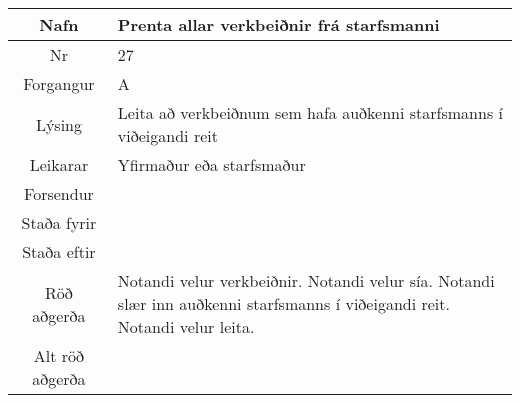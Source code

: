 \documentclass[a4paper]{article}
\begin{document}
\begin{tabular}{|c|p{10cm}|}
\hline
Nafn&Prenta allar verkbeiðnir frá starfsmanni\\
\hline
Nr&27\\
\hline
Forgangur&A\\
\hline
Lýsing&Leita að verkbeiðnum sem hafa auðkenni starfsmanns í viðeigandi reit\\
\hline
Leikarar&Yfirmaður eða starfsmaður\\
\hline
Forsendur&\\
\hline
Staða fyrir&\\
\hline
Staða eftir&\\
\hline
Röð aðgerða&Notandi velur verkbeiðnir. Notandi velur sía. Notandi slær inn auðkenni starfsmanns í viðeigandi reit. Notandi velur leita.\\
\hline
Alt röð aðgerða&\\
\hline
\end{tabular}
\end{document}
